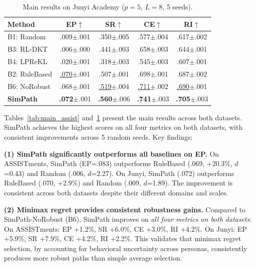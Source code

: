 \documentclass[runningheads]{llncs}
\begin{document}
\begin{table}[t]
\centering
\caption{Main results on Junyi Academy ($p=5$, $L=8$, 5 seeds).}
\label{tab:main_junyi}
\begin{tabular}{lcccc}
\toprule
\textbf{Method} & \textbf{EP}$\uparrow$ & \textbf{SR}$\uparrow$ & \textbf{CE}$\uparrow$ & \textbf{RI}$\uparrow$ \\
\midrule
B1: Random         & .009{\scriptsize$\pm$.001} & .350{\scriptsize$\pm$.005} & .577{\scriptsize$\pm$.004} & .617{\scriptsize$\pm$.002} \\
B3: RL-DKT         & .006{\scriptsize$\pm$.000} & .441{\scriptsize$\pm$.003} & .658{\scriptsize$\pm$.003} & .644{\scriptsize$\pm$.001} \\
B4: LPReKL         & .020{\scriptsize$\pm$.001} & .318{\scriptsize$\pm$.003} & .545{\scriptsize$\pm$.003} & .607{\scriptsize$\pm$.001} \\
B2: RuleBased      & \underline{.070}{\scriptsize$\pm$.001} & .507{\scriptsize$\pm$.001} & .698{\scriptsize$\pm$.001} & .687{\scriptsize$\pm$.002} \\
B6: NoRobust       & .068{\scriptsize$\pm$.001} & \underline{.519}{\scriptsize$\pm$.004} & \underline{.711}{\scriptsize$\pm$.002} & \underline{.690}{\scriptsize$\pm$.001} \\
\midrule
\textbf{SimPath}   & \textbf{.072}{\scriptsize$\pm$.001} & \textbf{.560}{\scriptsize$\pm$.006} & \textbf{.741}{\scriptsize$\pm$.003} & \textbf{.705}{\scriptsize$\pm$.003} \\
\bottomrule
\end{tabular}
\end{table}

Tables~\ref{tab:main_assist} and~\ref{tab:main_junyi} present the main results across both datasets.
SimPath achieves the highest scores on all four metrics on both datasets, with consistent improvements across 5 random seeds.
Key findings:

\textbf{(1) SimPath significantly outperforms all baselines on EP.}
On ASSISTments, SimPath (EP=.083) outperforms RuleBased (.069, +20.3\%, $d$=0.43) and Random (.006, $d$=2.27).
On Junyi, SimPath (.072) outperforms RuleBased (.070, +2.9\%) and Random (.009, $d$=1.89).
The improvement is consistent across both datasets despite their different domains and scales.

\textbf{(2) Minimax regret provides consistent robustness gains.}
Compared to SimPath-NoRobust (B6), SimPath improves on \emph{all four metrics on both datasets}:
On ASSISTments: EP +1.2\%, SR +6.0\%, CE +3.0\%, RI +4.2\%.
On Junyi: EP +5.9\%, SR +7.9\%, CE +4.2\%, RI +2.2\%.
This validates that minimax regret selection, by accounting for behavioral uncertainty across personas, consistently produces more robust paths than simple average selection.
\end{document}
